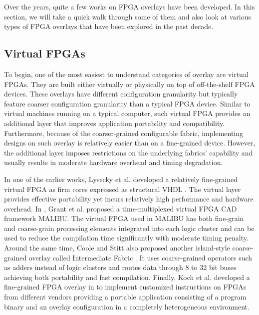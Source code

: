 Over the years, quite a few works on FPGA overlays have been developed.
In this section, we will take a quick walk through some of them and also look at various types of FPGA overlays that have been explored in the past decade.

\subsection{Virtual FPGAs}
To begin, one of the most easiest to understand categories of overlay are virtual FPGAs\cite{vFPGA,zuma2012,Grant2011Malibu,Coole2010Intermediate,Koch2013CI}. They are built either virtually or physically on top of off-the-shelf FPGA devices. These overlays have different configuration granularity but typically feature coarser configuration granularity than a typical FPGA device. Similar to virtual machines running on a typical computer, such virtual FPGA provides an additional layer that improves application portability and compatibility. Furthermore, because of the coarser-grained configurable fabric, implementing designs on such overlay is relatively easier than on a fine-grained device. However, the additional layer imposes restrictions on the underlying fabrics' capability and usually results in moderate hardware overhead and timing degradation.

In one of the earlier works, Lysecky et al. developed a relatively fine-grained virtual FPGA as firm cores expressed as structural VHDL \cite{vFPGA}. The virtual layer provides effective portability yet incurs relatively high performance and hardware overhead.
In \cite{Grant2011Malibu}, Grant et al. proposed a time-multiplexed virtual FPGA CAD framework MALIBU. The virtual FPGA used in MALIBU has both fine-grain and coarse-grain processing elements integrated into each logic cluster and can be used to reduce the compilation time significantly with moderate timing penalty. Around the same time, Coole and Stitt also proposed another island-style coarse-grained overlay called Intermediate Fabric \cite{Coole2010Intermediate}. It uses coarse-grained operators such as adders instead of logic clusters and routes data through 8 to 32 bit buses achieving both portability and fast compilation. Finally, Koch et al. developed a fine-grained FPGA overlay in \cite{Koch2013CI} to implement customized instructions on FPGAs from different vendors providing a portable application consisting of a program binary and an overlay configuration in a completely heterogeneous environment.

